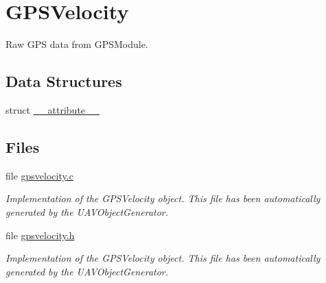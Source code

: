 \hypertarget{group___g_p_s_velocity}{\section{\-G\-P\-S\-Velocity}
\label{group___g_p_s_velocity}
}


\-Raw \-G\-P\-S data from \-G\-P\-S\-Module.  


\subsection*{\-Data \-Structures}
\begin{DoxyCompactItemize}
\item 
struct \hyperlink{struct____attribute____}{\-\_\-\-\_\-attribute\-\_\-\-\_\-}
\end{DoxyCompactItemize}
\subsection*{\-Files}
\begin{DoxyCompactItemize}
\item 
file \hyperlink{gpsvelocity_8c}{gpsvelocity.\-c}
\begin{DoxyCompactList}\small\item\em \-Implementation of the \-G\-P\-S\-Velocity object. \-This file has been automatically generated by the \-U\-A\-V\-Object\-Generator. \end{DoxyCompactList}\item 
file \hyperlink{gpsvelocity_8h}{gpsvelocity.\-h}
\begin{DoxyCompactList}\small\item\em \-Implementation of the \-G\-P\-S\-Velocity object. \-This file has been automatically generated by the \-U\-A\-V\-Object\-Generator. \end{DoxyCompactList}\end{DoxyCompactItemize}
